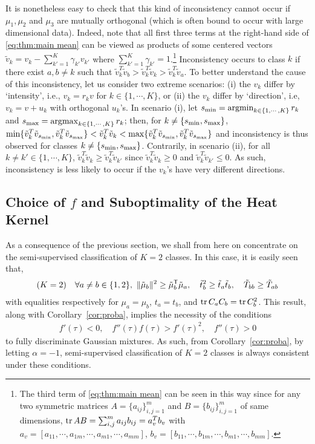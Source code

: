 \documentclass[twoside,11pt]{article}
\def\trans{{\sf T}}
\DeclareMathOperator{\tr}{{\rm tr}}
\DeclareMathOperator{\argmin}{{\rm argmin}}
\DeclareMathOperator{\argmax}{{\rm argmax}}
\begin{document}
It is nonetheless easy to check that this kind of inconsistency cannot occur if $\mu_1,\mu_2$ and $\mu_3$ are mutually orthogonal (which is often bound to occur with large dimensional data). Indeed, note that all first three terms at the right-hand side of \eqref{eq:thm:main mean} can be viewed as products of some centered vectors $\tilde{v}_k=v_k-\sum_{k'=1}^K\gamma_{k'}v_{k'}$ where $\sum_{k'=1}^{K}\gamma_{k'}=1$.\footnote{The third term of \eqref{eq:thm:main mean} can be seen in this way since for any two symmetric matrices $A=\{a_{ij}\}_{i,j=1}^m$ and $B=\{b_{ij}\}_{i,j=1}^m$ of same dimensions, $\tr AB=\sum_{i,j}^ma_{ij}b_{ij}=a_v^Tb_v$ with $a_v=[a_{11},\cdots,a_{1m},\cdots,a_{m1},\cdots,a_{mm}]$, $b_v=[b_{11},\cdots,b_{1m},\cdots,b_{m1},\cdots,b_{mm}]$.} Inconsistency occurs to class $k$ if there exist $a,b\neq k$ such that $\tilde{v}_k^T\tilde{v}_b>\tilde{v}_k^T\tilde{v}_k>\tilde{v}_k^T\tilde{v}_a$. To better understand the cause of this inconsistency, let us consider two extreme scenarios: (i) the $v_k$ differ by `intensity', i.e., $v_k=r_kv$ for $k\in\{1,\cdots,K\}$, or (ii) the $v_k$ differ by `direction', i.e, $v_k=v+u_k$ with orthogonal $u_k$'s. In scenario (i), let $s_{\rm min}=\argmin_{k\in\{1,\cdots,K\}} r_k$ and $s_{\rm max}=\argmax_{k\in\{1,\cdots,K\}}r_k$; then, for $k\neq \{s_{\rm min}, s_{\rm max}\}$, $\min\{\tilde{v}_k^T\tilde{v}_{s_{\rm min}},\tilde{v}_k^T\tilde{v}_{s_{\rm max}}\}<\tilde{v}_k^T\tilde{v}_k<\max\{\tilde{v}_k^T\tilde{v}_{s_{\rm min}},\tilde{v}_k^T\tilde{v}_{s_{\rm max}}\}$ and inconsistency is thus observed for classes $k\neq \{s_{\rm min}, s_{\rm max}\}$. Contrarily, in scenario (ii), for all $k\neq k'\in \{1,\cdots,K\}$,  $\tilde{v}_k^T\tilde{v}_k\geq\tilde{v}_k^T\tilde{v}_{k'}$ since $\tilde{v}_k^T\tilde{v}_k\geq0$ and $\tilde{v}_k^T\tilde{v}_{k'}\leq 0$. As such, inconsistency is less likely to occur if the $v_k$'s have very different directions.

 

\subsection{Choice of $f$ and Suboptimality of the Heat Kernel}
\label{sec:f}

As a consequence of the previous section, we shall from here on concentrate on the semi-supervised classification of $K=2$ classes. In this case, it is easily seen that,
\begin{align*}
	(K=2)\quad \forall a\neq b\in\{1,2\},~ \|\tilde \mu_b\|^2\geq \tilde \mu_b^\trans \tilde \mu_a,\quad \tilde{t}_b^2 \geq \tilde{t}_a\tilde{t}_b,\quad \tilde T_{bb}\geq \tilde T_{ab}
\end{align*}
with equalities respectively for $\mu_a=\mu_b$, $t_a=t_b$, and $\tr C_aC_b=\tr C_b^2$. This result, along with Corollary~\ref{cor:proba}, implies the necessity of the conditions
\begin{align*}
	f'(\tau)<0, \quad f''(\tau)f(\tau)>f'(\tau)^2,\quad f''(\tau)>0
\end{align*}
to fully discriminate Gaussian mixtures. As such, from Corollary~\ref{cor:proba}, by letting $\alpha=-1$, semi-supervised classification of $K=2$ classes is always consistent under these conditions. 
\end{document}
